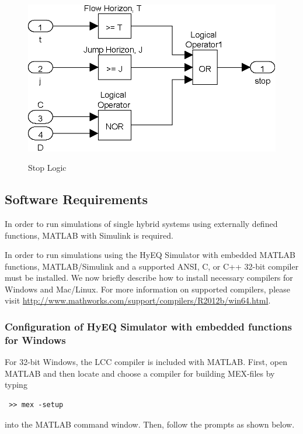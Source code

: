 \documentclass{article}
\begin{document}
\begin{figure}[ht]
  \begin{center}
    {\includegraphics[width=.5\textwidth]{figures/Simulink/StopLogic.eps}}
   \caption{Stop Logic}
\label{fig:StopLogic}
  \end{center}
\end{figure}

%

\subsection{Software Requirements}
In order to run simulations of single hybrid systems using externally defined functions, MATLAB with Simulink is required.

In order to run simulations using the HyEQ Simulator with embedded MATLAB functions, MATLAB/Simulink and a supported ANSI, C, or C++ 32-bit compiler must be installed. We now briefly describe how to install necessary compilers for Windows and Mac/Linux. For more information on supported compilers, please visit \url{http://www.mathworks.com/support/compilers/R2012b/win64.html}.


\subsubsection{Configuration of HyEQ Simulator with embedded functions for Windows}
For 32-bit Windows, the LCC compiler is included with MATLAB. First, open MATLAB and then locate and choose a compiler for building MEX-files by typing \begin{verbatim} >> mex -setup \end{verbatim}
into the MATLAB command window. Then, follow the prompts as shown below.
\end{document}
